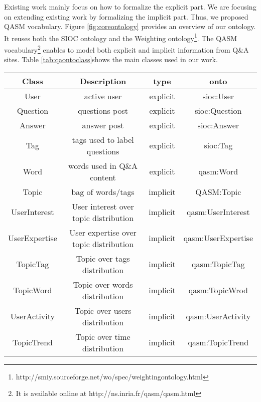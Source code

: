 Existing work mainly focus on how to formalize the explicit part. We are focusing on extending existing work by formalizing the implicit part. Thus, we proposed QASM vocabulary. Figure \ref{fig:coreontology} provides an overview of our ontology. It reuses both the SIOC ontology and the Weighting ontology\footnote{http://smiy.sourceforge.net/wo/spec/weightingontology.html}.
The QASM vocabulary\footnote{It is available online at http://ns.inria.fr/qasm/qasm.html} enables to model both explicit and implicit information from Q\&A sites. Table \ref{tab:qaontoclass}shows the main classes used in our work.


\begin{sidewaystable}
    \centering
    \begin{tabular}{c|c|c|c}
    \hline
    Class &  Description & type & onto \\ \hline
    User  & active user & explicit &  sioc:User \\ \hline
    Question & questions post & explicit & sioc:Question \\ \hline
    Answer  & answer post & explicit & sioc:Answer \\ \hline
    Tag & tags used to label questions & explicit & sioc:Tag \\ \hline
    Word & words used in Q\&A content & explicit & qasm:Word \\ \hline
    Topic & bag of words/tags & implicit & QASM:Topic \\ \hline     
    UserInterest& User interest over topic distribution & implicit& qasm:UserInterest\\ \hline
    UserExpertise & User expertise over topic distribution &implicit& qasm:UserExpertise \\ \hline
    TopicTag &Topic over tags distribution&implicit &qasm:TopicTag \\ \hline
    
    TopicWord&Topic over words distribution &implicit & qasm:TopicWrod\\ \hline
    
    UserActivity&Topic over users distribution & implicit &qasm:UserActivity \\ \hline
    
    TopicTrend &Topic over time distribution &implicit & qasm:TopicTrend\\ \hline
          
    \end{tabular}
    \caption{the Vocabulary (class) used in our work}
    \label{tab:qaontoclass}
\end{sidewaystable}



